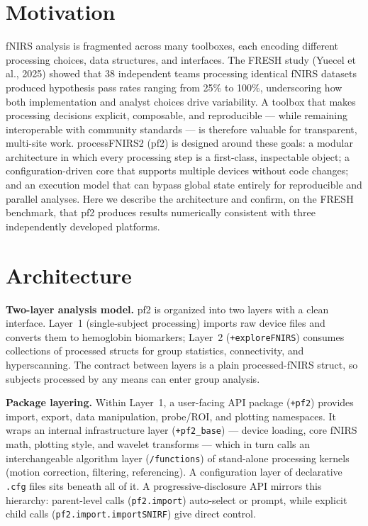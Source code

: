 \documentclass[11pt]{article}
\begin{document}
\section*{Motivation}

fNIRS analysis is fragmented across many toolboxes, each encoding different
processing choices, data structures, and interfaces. The FRESH study
(Yuecel et al., 2025) showed that 38 independent teams processing identical
fNIRS datasets produced hypothesis pass rates ranging from 25\% to 100\%,
underscoring how both implementation and analyst choices drive variability. A
toolbox that makes processing decisions explicit, composable, and reproducible
--- while remaining interoperable with community standards --- is therefore
valuable for transparent, multi-site work. processFNIRS2 (pf2) is designed
around these goals: a modular architecture in which every processing step is a
first-class, inspectable object; a configuration-driven core that supports
multiple devices without code changes; and an execution model that can bypass
global state entirely for reproducible and parallel analyses. Here we describe
the architecture and confirm, on the FRESH benchmark, that pf2 produces results
numerically consistent with three independently developed platforms.

\section*{Architecture}

\textbf{Two-layer analysis model.} pf2 is organized into two layers with a
clean interface. Layer~1 (single-subject processing) imports raw device files
and converts them to hemoglobin biomarkers; Layer~2 (\texttt{+exploreFNIRS})
consumes collections of processed structs for group statistics, connectivity,
and hyperscanning. The contract between layers is a plain processed-fNIRS
struct, so subjects processed by any means can enter group analysis.

\textbf{Package layering.} Within Layer~1, a user-facing API package
(\texttt{+pf2}) provides import, export, data manipulation, probe/ROI, and
plotting namespaces. It wraps an internal infrastructure layer
(\texttt{+pf2\_base}) --- device loading, core fNIRS math, plotting style, and
wavelet transforms --- which in turn calls an interchangeable algorithm layer
(\texttt{/functions}) of stand-alone processing kernels (motion correction,
filtering, referencing). A configuration layer of declarative \texttt{.cfg}
files sits beneath all of it. A progressive-disclosure API mirrors this
hierarchy: parent-level calls (\texttt{pf2.import}) auto-select or prompt, while
explicit child calls (\texttt{pf2.import.importSNIRF}) give direct control.
\end{document}
